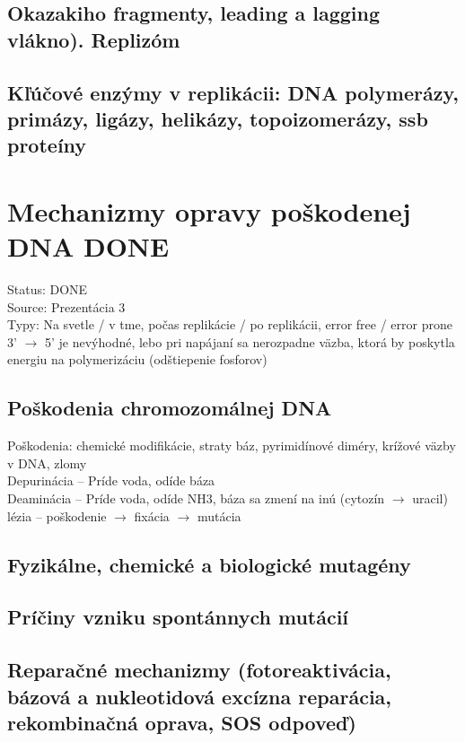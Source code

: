 \subsection*{Okazakiho fragmenty, leading a lagging vlákno). Replizóm}

\subsection*{Kľúčové enzýmy v replikácii: DNA polymerázy, primázy, ligázy, helikázy, topoizomerázy, ssb proteíny}

\section{Mechanizmy opravy poškodenej DNA DONE}

Status: DONE\\
Source: Prezentácia 3\\

Typy: Na svetle / v tme, počas replikácie / po replikácii, error free / error prone\\
3' $\rightarrow$ 5' je nevýhodné, lebo pri napájaní sa nerozpadne väzba, ktorá by poskytla energiu na polymerizáciu (odštiepenie fosforov)\\

\subsection*{Poškodenia chromozomálnej DNA}
Poškodenia: chemické modifikácie, straty báz, pyrimidínové diméry, krížové väzby v DNA, zlomy\\
Depurinácia -- Príde voda, odíde báza\\
Deaminácia -- Príde voda, odíde NH3, báza sa zmení na inú (cytozín $\rightarrow$ uracil)\\
lézia -- poškodenie $\rightarrow$ fixácia $\rightarrow$ mutácia\\
\subsection*{Fyzikálne, chemické a biologické mutagény}

\subsection*{Príčiny vzniku spontánnych mutácií}

\subsection*{Reparačné mechanizmy (fotoreaktivácia, bázová a nukleotidová excízna reparácia, rekombinačná oprava, SOS odpoveď)}

